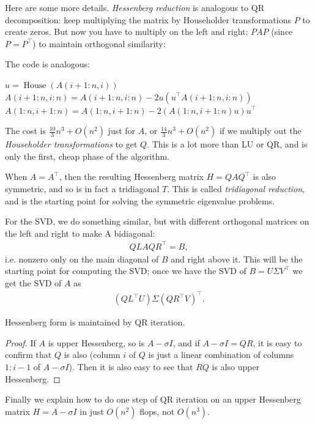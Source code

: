 \documentclass[11pt]{article}
\numberwithin{equation}{section}
\begin{document}
Here are some more details.
\textit{Hessenberg reduction} is analogous to QR decomposition: keep multiplying the matrix by Householder transformations $P$ to create zeros. 
But now you have to multiply on the left and right: $PAP$ (since $P=P^\top$) to maintain orthogonal similarity:

The code is analogous:
\begin{algorithmfrm}
    \begin{algorithmic}
            \State $u = \operatorname{House}(A(i+1:n,i))$
            \State $A(i+1:n,i:n) = A(i+1:n,i:n) - 2u(u^\top A(i+1:n,i:n))$
            \State $A(1:n,i+1:n) = A(1:n,i+1:n) - 2(A(1:n,i+1:n)u)u^\top$
        \EndFor
    \end{algorithmic}
\end{algorithmfrm}
The cost is $\frac{10}{3}n^3 + O(n^2)$ just for $A$, or $\frac{14}{3}n^3 + O(n^2)$ if we multiply out the \textit{Householder transformations} to get $Q$. 
This is a lot more than LU or QR, and is only the first, cheap phase of the algorithm.

When $A = A^\top$, then the resulting Hessenberg matrix $H = QAQ^\top$ is also symmetric, and so is in fact a tridiagonal $T$. 
This is called \textit{tridiagonal reduction}, and is the starting point for solving the symmetric eigenvalue problems. 

For the SVD, we do something similar,  but with different orthogonal matrices on the left and right to make A bidiagonal: \begin{align*}
    QLAQR^\top = B,
\end{align*}
i.e. nonzero only on the main diagonal of $B$ and right above it. This will be the starting point for computing the SVD; 
once we have the SVD of $B = U\Sigma V^\top$ we get the SVD of $A$ as \begin{align*}
    (QL^\top U)\Sigma (QR^\top V)^{\top}.
\end{align*}

\begin{lemma}
    Hessenberg form is maintained by QR iteration.
    \begin{proof}
        If $A$ is upper Hessenberg, so is $A - \sigma I$, and if $A - \sigma I = QR$, 
        it is easy to confirm that $Q$ is also (column $i$ of $Q$ is just a linear combination of columns $1:i-1$ of $A - \sigma I$). 
        Then it is also easy to see that $RQ$ is also upper Hessenberg.
    \end{proof}
\end{lemma}
Finally we explain how to do one step of QR iteration on an upper Hessenberg matrix $H = A - \sigma I$ in just $O(n^2)$ flops, not $O(n^3)$.
\end{document}
